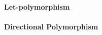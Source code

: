 \documentclass[11pt]{iuthesis}
\begin{document}




\paragraph{Let-polymorphism}


\paragraph{Directional Polymorphism}

%



\end{document}
